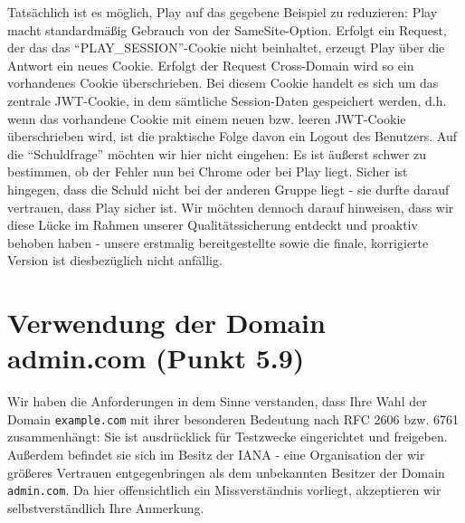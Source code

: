 \documentclass[12pt,DIV14,BCOR10mm,a4paper,parskip=half-,headsepline,headinclude,english,ngerman,bibliography=totocnumbered]{scrreprt}
\begin{document}
Tatsächlich ist es möglich, Play auf das gegebene Beispiel zu reduzieren: Play macht standardmäßig Gebrauch von der SameSite-Option. Erfolgt ein Request, der das das \enquote{PLAY\_SESSION}-Cookie nicht beinhaltet, erzeugt Play über die Antwort ein neues Cookie. Erfolgt der Request Cross-Domain wird so ein vorhandenes Cookie überschrieben. Bei diesem Cookie handelt es sich um das zentrale JWT-Cookie, in dem sämtliche Session-Daten gespeichert werden, d.h. wenn das vorhandene Cookie mit einem neuen bzw. leeren JWT-Cookie überschrieben wird, ist die praktische Folge davon ein Logout des Benutzers.\newline\newline
Auf die \enquote{Schuldfrage} möchten wir hier nicht eingehen: Es ist äußerst schwer zu bestimmen, ob der Fehler nun bei Chrome oder bei Play liegt. Sicher ist hingegen, dass die Schuld nicht bei der anderen Gruppe liegt - sie durfte darauf vertrauen, dass Play sicher ist. Wir möchten dennoch darauf hinweisen, dass wir diese Lücke im Rahmen unserer Qualitätssicherung entdeckt und proaktiv behoben haben - unsere erstmalig bereitgestellte sowie die finale, korrigierte Version ist diesbezüglich nicht anfällig.

\section{Verwendung der Domain admin.com (Punkt 5.9)}

Wir haben die Anforderungen in dem Sinne verstanden, dass Ihre Wahl der Domain \texttt{example.com} mit ihrer besonderen Bedeutung nach RFC 2606 bzw. 6761 zusammenhängt: Sie ist ausdrücklick für Testzwecke eingerichtet und freigeben. Außerdem befindet sie sich im Besitz der IANA - eine Organisation der wir größeres Vertrauen entgegenbringen als dem unbekannten Besitzer der Domain \texttt{admin.com}.
Da hier offensichtlich ein Missverständnis vorliegt, akzeptieren wir selbstverständlich Ihre Anmerkung.



\printbibliography

\printacronyms[title=Abkürzungsverzeichnis,toctitle=Abkürzungsverzeichnis]
\printglossary[title=Glossar,toctitle=Glossar,type=main]

\iftotalfigures
  \listoffigures
\fi

\end{document}
